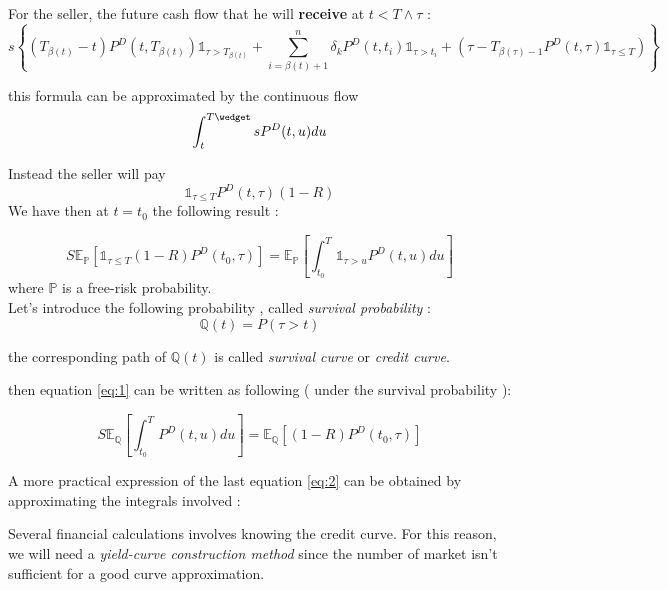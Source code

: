 For the seller, the future cash flow that he will \textbf{receive} at $t<T\wedge\tau$ :
\[
s\left\{(T_{\beta(t)}-t)P^D(t,T_{\beta(t)})\mathds{1}_{\tau>T_{\beta(t)}}+
\sum^n_{i=\beta(t)+1}\delta_k
P^D(t,t_i)\mathds{1}_{\tau>t_i}+(\tau-T_{\beta(\tau)-1}P^D(t,\tau)\mathds{1}_{\tau
  \leq
  T})\right\}
\]

this formula can be approximated by the continuous flow
\[
\int_t^{T\wedget}sP^D(t,u)du
\]

Instead the seller will pay 
\[
\mathds{1}_{\tau \leq T}P^D(t,\tau)(1-R)
\]
We have then at $t=t_0$ the following result :

\begin{equation}
  \label{eq:1}
S  \mathbb{E}_{\mathbb{P}}\left[\mathds{1}_{\tau \leq T}(1-R)P^D(t_0,\tau)\right]=
\mathbb{E}_\mathbb{P}\left[\int_{t_0}^T\mathds{1}_{\tau>u}P^D(t,u)du\right]  
\end{equation}
where $\mathbb{P}$ is a free-risk probability.\\


Let's introduce the following probability , called {\it survival probability} : 
\[
\mathbb{Q}(t) = P(\tau > t)
\]
\begin{example}[NB]
the corresponding  path of $\mathbb{Q}(t)$ is  called {\it survival curve  } or
{\it credit curve}.
  
\end{example}
then  equation \ref{eq:1}  can  be written  as following  (  under the  survival
probability ):
\begin{center}
  \begin{equation}
  \label{eq:2}
S  \mathbb{E}_\mathbb{Q}\left[\int_{t_0}^TP^D(t,u)du\right]= 
  \mathbb{E}_{\mathbb{Q}}\left[(1-R)P^D(t_0,\tau)\right]
\end{equation}
\end{center}
A more practical  expression of the last equation \ref{eq:2}  can be obtained by
approximating the integrals involved :

\begin{center}
\end{center}



Several  financial calculations  involves  knowing the  credit  curve. For  this
reason,  we will  need a  \textit{yield-curve construction  method} since the number  of
market isn't sufficient for a good curve approximation.\\





